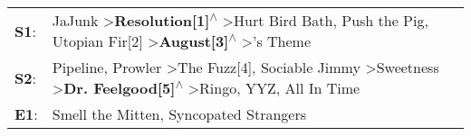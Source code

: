 \begin{supertabular}{p{0.03\textwidth}p{0.92\textwidth}}
 \textbf{S1}:  &                                                JaJunk\textsuperscript{} \textgreater \enspace \textbf{Resolution[1]\textsuperscript{$\wedge$}} \textgreater \enspace Hurt Bird Bath\textsuperscript{}, \enspace Push the Pig\textsuperscript{}, \enspace Utopian Fir[2]\textsuperscript{} \textgreater \enspace \textbf{August[3]\textsuperscript{$\wedge$}} \textgreater {}'s Theme\textsuperscript{}  \enspace  \\
 \textbf{S2}:  &  Pipeline\textsuperscript{}, \enspace Prowler\textsuperscript{} \textgreater \enspace The Fuzz[4]\textsuperscript{}, \enspace Sociable Jimmy\textsuperscript{} \textgreater \enspace Sweetness\textsuperscript{} \textgreater \enspace \textbf{Dr. Feelgood[5]\textsuperscript{$\wedge$}} \textgreater \enspace Ringo\textsuperscript{}, \enspace YYZ\textsuperscript{}, \enspace All In Time\textsuperscript{}  \enspace  \\
 \textbf{E1}:  &                                                                                                                                                                                                                                                                                                                             Smell the Mitten\textsuperscript{}, \enspace Syncopated Strangers\textsuperscript{}  \enspace  \\
\end{supertabular}
